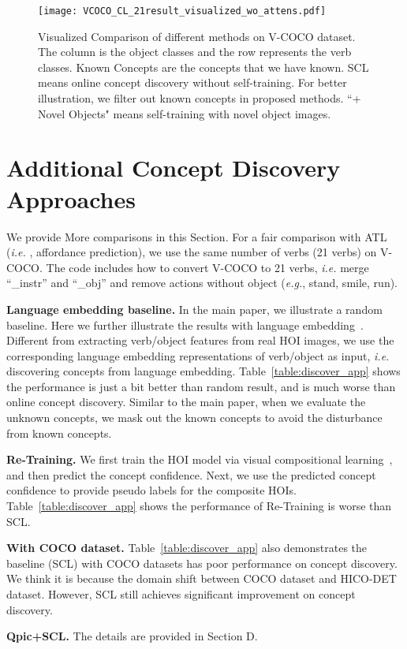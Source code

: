 \documentclass[runningheads]{llncs}
\newcommand{\ie}{\textit{i.e. }}
\newcommand{\eg}{\textit{e.g.}}
\begin{document}
\begin{figure*}
    \texttt{[image: VCOCO\_CL\_21result\_visualized\_wo\_attens.pdf]}
    \caption{Visualized Comparison of different methods on V-COCO dataset. The column is the object classes and the row represents the verb classes. Known Concepts are the concepts that we have known. SCL means online concept discovery without self-training. For better illustration, we filter out known concepts in proposed methods. ``+ Novel Objects" means self-training with novel object images.}
    \label{fig:vis_comp}
\end{figure*}























\section{Additional Concept Discovery Approaches}
\label{sec:cd_exp}

We provide More comparisons in this Section. For a fair comparison with ATL~\cite{hou2021atl} (\ie, affordance prediction), we use the same number of verbs (21 verbs) on V-COCO. The code includes how to convert V-COCO to 21 verbs, \ie merge ``\_instr'' and ``\_obj'' and remove actions without object (\eg, stand, smile, run). 

{\bf Language embedding baseline.} In the main paper, we illustrate a random baseline. Here we further illustrate the results with language embedding~\cite{pennington2014glove}. Different from extracting verb/object features from real HOI images, we use the corresponding language embedding representations of verb/object as input, \ie discovering concepts from language embedding. Table~\ref{table:discover_app} shows the performance is just a bit better than random result, and is much worse than online concept discovery. Similar to the main paper, when we evaluate the unknown concepts, we mask out the known concepts to avoid the disturbance from known concepts.

{\bf Re-Training.} We first train the HOI model via visual compositional learning~\cite{hou2020visual}, and then predict the concept confidence. Next, we use the predicted concept confidence to provide pseudo labels for the composite HOIs. Table~\ref{table:discover_app} shows the performance of Re-Training is worse than SCL. 

{\bf With COCO dataset.} Table~\ref{table:discover_app} also demonstrates the baseline (SCL) with COCO datasets has poor performance on concept discovery. We think it is because the domain shift between COCO dataset and HICO-DET dataset. However, SCL still achieves significant improvement on concept discovery.

{\bf Qpic+SCL.} The details are provided in Section D.
\end{document}
